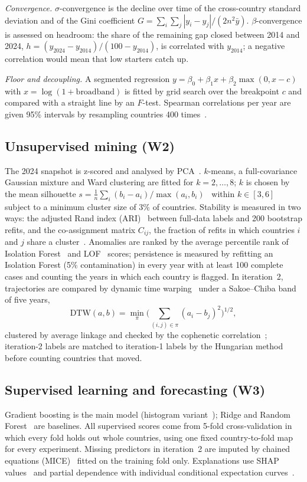 \documentclass[conference,a4paper]{IEEEtran}
\begin{document}
\textit{Convergence.} $\sigma$-convergence is the decline over time of the cross-country standard
deviation and of the Gini coefficient $G=\sum_i\sum_j|y_i-y_j|/(2n^2\bar y)$. $\beta$-convergence is
assessed on headroom: the share of the remaining gap closed between 2014 and 2024,
$h=(y_{2024}-y_{2014})/(100-y_{2014})$, is correlated with $y_{2014}$; a negative correlation would
mean that low starters catch up.

\textit{Floor and decoupling.} A segmented regression
$y=\beta_0+\beta_1x+\beta_2\max(0,x-c)$ with $x=\log(1+\text{broadband})$ is fitted by grid search
over the breakpoint $c$ and compared with a straight line by an $F$-test. Spearman correlations per
year are given 95\% intervals by resampling countries 400 times~\cite{efron1993}.

\subsection{Unsupervised mining (W2)}
The 2024 snapshot is z-scored and analysed by PCA~\cite{jolliffe2016}. $k$-means, a full-covariance
Gaussian mixture and Ward clustering are fitted for $k=2,\dots,8$; $k$ is chosen by the mean
silhouette $s=\frac{1}{n}\sum_i (b_i-a_i)/\max(a_i,b_i)$~\cite{rousseeuw1987} within $k\in[3,6]$
subject to a minimum cluster size of 3\% of countries. Stability is measured in two ways: the adjusted
Rand index (ARI)~\cite{hubert1985} between full-data labels and 200 bootstrap refits, and the
co-assignment matrix $C_{ij}$, the fraction of refits in which countries $i$ and $j$ share a
cluster~\cite{monti2003consensus}. Anomalies are ranked by the average percentile rank of Isolation
Forest~\cite{liu2008if} and LOF~\cite{breunig2000lof} scores; persistence is measured by refitting an
Isolation Forest (5\% contamination) in every year with at least 100 complete cases and counting
the years in which each country is flagged. In iteration~2, trajectories are compared by dynamic time
warping~\cite{sakoe1978dtw} under a Sakoe--Chiba band of five years,
\begin{equation}
\mathrm{DTW}(a,b)=\min_{\pi}\Big(\sum_{(i,j)\in\pi}(a_i-b_j)^2\Big)^{1/2},
\end{equation}
clustered by average linkage and checked by the cophenetic correlation~\cite{sokal1962cophenetic};
iteration-2 labels are matched to iteration-1 labels by the Hungarian method~\cite{kuhn1955hungarian}
before counting countries that moved.

\subsection{Supervised learning and forecasting (W3)}
Gradient boosting is the main model (histogram variant~\cite{ke2017lightgbm}); Ridge and Random
Forest~\cite{breiman2001rf} are baselines. All supervised scores come from 5-fold cross-validation
in which every fold holds out whole countries, using one fixed country-to-fold map for every
experiment. Missing predictors in iteration~2 are imputed by chained equations
(MICE)~\cite{vanbuuren2011mice} fitted on the training fold only. Explanations use SHAP
values~\cite{lundberg2017shap} and partial dependence with individual conditional expectation
curves~\cite{friedman2001,goldstein2015}.
\end{document}
